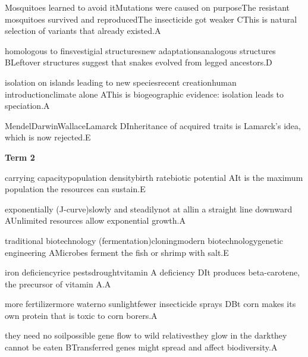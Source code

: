 \begin{gradebody}
{Mosquitoes learned to avoid it}{Mutations were caused on purpose}{The resistant mosquitoes survived and reproduced}{The insecticide got weaker}
{C}{This is natural selection of variants that already existed.}{A}

{homologous to fins}{vestigial structures}{new adaptations}{analogous structures}
{B}{Leftover structures suggest that snakes evolved from legged ancestors.}{D}

{isolation on islands leading to new species}{recent creation}{human introduction}{climate alone}
{A}{This is biogeographic evidence: isolation leads to speciation.}{A}

{Mendel}{Darwin}{Wallace}{Lamarck}
{D}{Inheritance of acquired traits is Lamarck's idea, which is now rejected.}{E}

\textbf{Term 2}

{carrying capacity}{population density}{birth rate}{biotic potential}
{A}{It is the maximum population the resources can sustain.}{E}

{exponentially (J-curve)}{slowly and steadily}{not at all}{in a straight line downward}
{A}{Unlimited resources allow exponential growth.}{A}

{traditional biotechnology (fermentation)}{cloning}{modern biotechnology}{genetic engineering}
{A}{Microbes ferment the fish or shrimp with salt.}{E}

{iron deficiency}{rice pests}{drought}{vitamin A deficiency}
{D}{It produces beta-carotene, the precursor of vitamin A.}{A}

{more fertilizer}{more water}{no sunlight}{fewer insecticide sprays}
{D}{Bt corn makes its own protein that is toxic to corn borers.}{A}

{they need no soil}{possible gene flow to wild relatives}{they glow in the dark}{they cannot be eaten}
{B}{Transferred genes might spread and affect biodiversity.}{A}


\end{gradebody}
